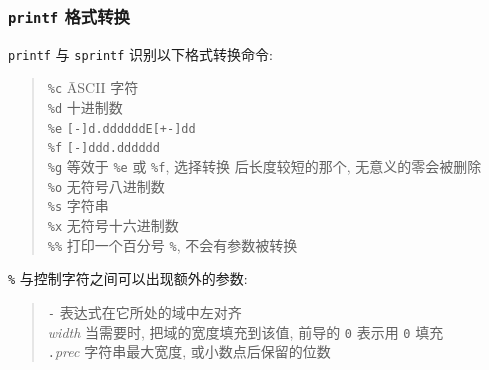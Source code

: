 
\subsubsection{\textbf{\texttt{printf}} 格式转换}
\texttt{printf} 与 \texttt{sprintf} 识别以下格式转换命令:
\begin{quote}
    \begin{tabbing}
        \verb'%c' \hspace{4em}      \= ASCII 字符 \\

        \verb'%d'       \> 十进制数 \\

        \verb'%e'       \> \texttt{[-]d.ddddddE[+-]dd}  \\

        \verb'%f'       \> \texttt{[-]ddd.dddddd} \\

        \verb'%g'       \> 等效于 \verb'%e' 或 \verb'%f', 选择转换
                后长度较短的那个, 无意义的零会被删除    \\

        \verb'%o'       \> 无符号八进制数 \\

        \verb'%s'       \> 字符串       \\

        \verb'%x'       \> 无符号十六进制数 \\

        \verb'%%'       \> 打印一个百分号 \verb'%', 不会有参数被转换 \\
    \end{tabbing}
\end{quote}

\verb'%' 与控制字符之间可以出现额外的参数:

\begin{quote}
    \begin{tabbing}
        \texttt{-} \hspace{4em}     \= 表达式在它所处的域中左对齐   \\

        \textit{width}  \> 当需要时, 把域的宽度填充到该值, 前导的
        \texttt{0} 表示用 \texttt{0} 填充 \\

        \texttt{.}\textit{prec} \> 字符串最大宽度, 或小数点后保留的位数 \\
    \end{tabbing}
\end{quote}


